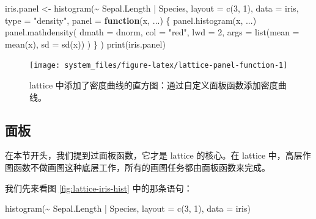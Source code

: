 \documentclass[
  b5paper,
  UTF8,twoside]{book}
\newenvironment{Shaded}{\begin{snugshade}}{\end{snugshade}}
\newcommand{\AttributeTok}[1]{\textcolor[rgb]{0.77,0.63,0.00}{#1}}
\newcommand{\ControlFlowTok}[1]{\textcolor[rgb]{0.13,0.29,0.53}{\textbf{#1}}}
\newcommand{\DecValTok}[1]{\textcolor[rgb]{0.00,0.00,0.81}{#1}}
\newcommand{\FunctionTok}[1]{\textcolor[rgb]{0.00,0.00,0.00}{#1}}
\newcommand{\NormalTok}[1]{#1}
\newcommand{\OtherTok}[1]{\textcolor[rgb]{0.56,0.35,0.01}{#1}}
\newcommand{\SpecialCharTok}[1]{\textcolor[rgb]{0.00,0.00,0.00}{#1}}
\newcommand{\StringTok}[1]{\textcolor[rgb]{0.31,0.60,0.02}{#1}}
\begin{document}
\begin{Shaded}
\begin{Highlighting}[]
\NormalTok{iris.panel }\OtherTok{\textless{}{-}} \FunctionTok{histogram}\NormalTok{(}\SpecialCharTok{\textasciitilde{}}\NormalTok{ Sepal.Length }\SpecialCharTok{|}\NormalTok{ Species,}
  \AttributeTok{layout =} \FunctionTok{c}\NormalTok{(}\DecValTok{3}\NormalTok{, }\DecValTok{1}\NormalTok{), }\AttributeTok{data =}\NormalTok{ iris, }\AttributeTok{type =} \StringTok{"density"}\NormalTok{,}
  \AttributeTok{panel =} \ControlFlowTok{function}\NormalTok{(x, ...) \{}
    \FunctionTok{panel.histogram}\NormalTok{(x, ...)}
    \FunctionTok{panel.mathdensity}\NormalTok{(}
      \AttributeTok{dmath =}\NormalTok{ dnorm, }\AttributeTok{col =} \StringTok{"red"}\NormalTok{,}
      \AttributeTok{lwd =} \DecValTok{2}\NormalTok{, }\AttributeTok{args =} \FunctionTok{list}\NormalTok{(}\AttributeTok{mean =} \FunctionTok{mean}\NormalTok{(x), }\AttributeTok{sd =} \FunctionTok{sd}\NormalTok{(x))}
\NormalTok{    )}
\NormalTok{  \}}
\NormalTok{)}
\FunctionTok{print}\NormalTok{(iris.panel)}
\end{Highlighting}
\end{Shaded}

\begin{figure}

{\centering \texttt{[image: system\_files/figure-latex/lattice-panel-function-1]} 

}

\caption[lattice 中添加了密度曲线的直方图]{lattice 中添加了密度曲线的直方图：通过自定义面板函数添加密度曲线。}\label{fig:lattice-panel-function}
\end{figure}



\hypertarget{ux9762ux677f}{%
\subsection{面板}\label{ux9762ux677f}}

在本节开头，我们提到过面板函数，它才是 lattice 的核心。在 lattice 中，高层作图函数不做画图这种底层工作，所有的画图任务都由面板函数来完成。

我们先来看图 \ref{fig:lattice-iris-hist} 中的那条语句：

\begin{Shaded}
\begin{Highlighting}[]
\FunctionTok{histogram}\NormalTok{(}\SpecialCharTok{\textasciitilde{}}\NormalTok{ Sepal.Length }\SpecialCharTok{|}\NormalTok{ Species, }\AttributeTok{layout =} \FunctionTok{c}\NormalTok{(}\DecValTok{3}\NormalTok{, }\DecValTok{1}\NormalTok{), }\AttributeTok{data =}\NormalTok{ iris)}
\end{Highlighting}
\end{Shaded}
\end{document}
